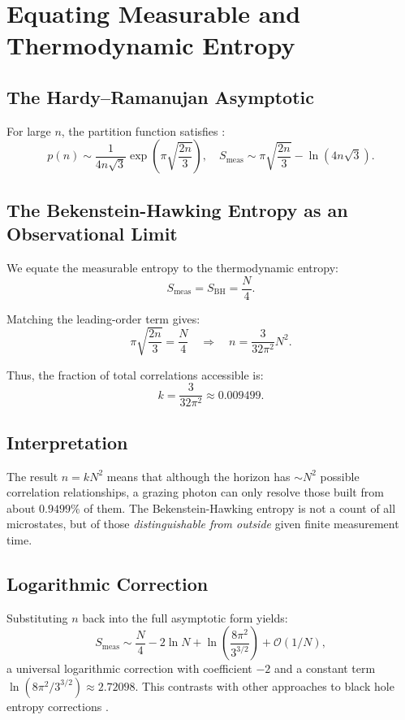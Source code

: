 \documentclass[12pt, letterpaper]{article}
\begin{document}
\section{Equating Measurable and Thermodynamic Entropy}

\subsection{The Hardy–Ramanujan Asymptotic}

For large $n$, the partition function satisfies \cite{hardy1918}:
\begin{equation}
p(n) \sim \frac{1}{4n\sqrt{3}} \exp\left( \pi \sqrt{\frac{2n}{3}} \right),
\quad
S_{\mathrm{meas}} \sim \pi \sqrt{\frac{2n}{3}} - \ln(4n\sqrt{3}).
\label{eq:HR}
\end{equation}

\subsection{The Bekenstein-Hawking Entropy as an Observational Limit}

We equate the measurable entropy to the thermodynamic entropy:
\[
S_{\mathrm{meas}} = S_{\mathrm{BH}} = \frac{N}{4}.
\]

Matching the leading-order term gives:
\[
\pi \sqrt{\frac{2n}{3}} = \frac{N}{4}
\quad\Rightarrow\quad
n = \frac{3}{32\pi^2} N^2.
\]

Thus, the fraction of total correlations accessible is:
\begin{equation}
k = \frac{3}{32\pi^2} \approx 0.009499.
\label{eq:k}
\end{equation}

\subsection{Interpretation}

The result $n = k N^2$ means that although the horizon has $\sim N^2$ possible correlation relationships, a grazing photon can only resolve those built from about $0.9499\%$ of them. The Bekenstein-Hawking entropy is not a count of all microstates, but of those \emph{distinguishable from outside} given finite measurement time.

\subsection{Logarithmic Correction}

Substituting $n$ back into the full asymptotic form yields:
\[
S_{\mathrm{meas}} \sim \frac{N}{4} - 2\ln N + \ln\left(\frac{8\pi^{2}}{3^{3/2}}\right) + \mathcal{O}(1/N),
\]
a universal logarithmic correction with coefficient $-2$ and a constant term $\ln(8\pi^{2}/3^{3/2}) \approx 2.72098$. This contrasts with other approaches to black hole entropy corrections \cite{cardy1986, page1993}.
\end{document}

